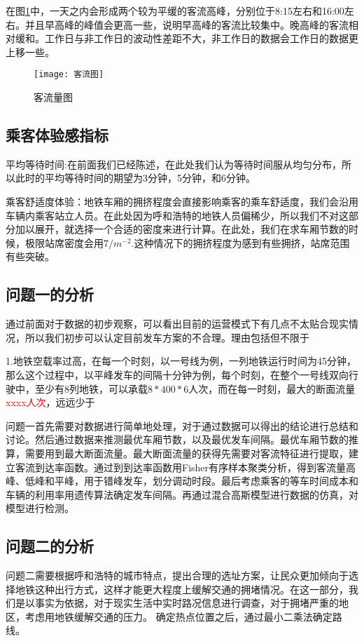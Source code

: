 \documentclass[12pt,a4paper]{mcmthesis}
\begin{document}
在图\ref{fig:客流量}中，一天之内会形成两个较为平缓的客流高峰，分别位于8:15左右和16:00左右。并且早高峰的峰值会更高一些，说明早高峰的客流比较集中。晚高峰的客流相对缓和。工作日与非工作日的波动性差距不大，非工作日的数据会工作日的数据更上移一些。

\begin{figure}[h!t]
	\centerline{\texttt{[image: 客流图]}\quad
	}
	\caption{\song\wuhao
		客流量图}
	\label{fig:客流量}
\end{figure}

\subsection{乘客体验感指标}
平均等待时间:在前面我们已经陈述，在此处我们认为等待时间服从均匀分布，所以此时的平均等待时间的期望为3分钟，5分钟，和6分钟。

乘客舒适度体验：地铁车厢的拥挤程度会直接影响乘客的乘车舒适度，我们会沿用车辆内乘客站立人员。在此处因为呼和浩特的地铁人员偏稀少，所以我们不对这部分加以展开，就选择一个合适的密度来进行计算。在此处，我们在求车厢节数的时候，极限站席密度会用$7/m^{-2}$.这种情况下的拥挤程度为感到有些拥挤，站席范围有些突破。

\subsection{问题一的分析}

 通过前面对于数据的初步观察，可以看出目前的运营模式下有几点不太贴合现实情况，所以我们初步可以认定目前发车方案的不合理。理由包括但不限于
 
 1.地铁空载率过高，在每一个时刻，以一号线为例，一列地铁运行时间为45分钟，那么这个过程中，以平峰发车的间隔十分钟为例，每个时刻，在整个一号线双向行驶中，至少有8列地铁，可以承载$8*400*6$人次，而在每一时刻，最大的断面流量\textcolor{red}{xxxx人次}，远远少于
 
 
 
 {问题一首先需要对数据进行简单地处理，对于通过数据可以得出的结论进行总结和讨论。然后通过数据来推测最优车厢节数，以及最优发车间隔。最优车厢节数的推算，需要用到最大断面流量。最大断面流量的获得先需要对客流特征进行提取，建立客流到达率函数。通过到到达率函数用Fisher有序样本聚类分析，得到客流量高峰、低峰和平峰，用于错峰发车，划分调动时段。最后考虑乘客的等车时间成本和车辆的利用率用遗传算法确定发车间隔。再通过混合高斯模型进行数据的仿真，对模型进行检测。}


\subsection{问题二的分析}
问题二需要根据呼和浩特的城市特点，提出合理的选址方案，让民众更加倾向于选择地铁这种出行方式，这样才能更大程度上缓解交通的拥堵情况。在这一部分，我们是以事实为依据，对于现实生活中实时路况信息进行调查，对于拥堵严重的地区，考虑用地铁缓解交通的压力。
确定热点位置之后，通过最小二乘法确定路线。
\end{document}
